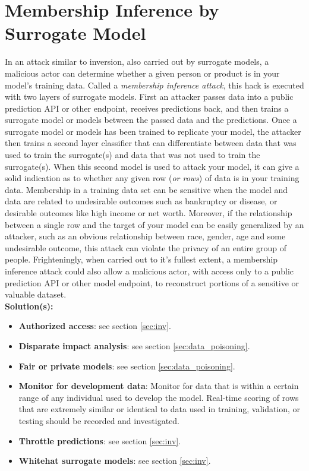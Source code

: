 \documentclass[fleqn]{article}
\begin{document}
\section{Membership Inference by Surrogate Model} \label{sec:mi}

In an attack similar to inversion, also carried out by surrogate models, a malicious actor can determine whether a given person or product is in your model's training data.  Called a \textit{membership inference attack}, this hack is executed with two layers of surrogate models. First an attacker passes data into a public prediction API or other endpoint, receives predictions back, and then trains a surrogate model or models between the passed data and the predictions. Once a surrogate model or models has been trained to replicate your model, the attacker then trains a second layer classifier that can differentiate between data that was used to train the surrogate(s) and data that was not used to train the surrogate(s). When this second model is used to attack your model, it can give a solid indication as to whether any given row (\textit{or rows}) of data is in your training data. Membership in a training data set can be sensitive when the model and data are related to undesirable outcomes such as bankruptcy or disease, or desirable outcomes like high income or net worth. Moreover, if the relationship between a single row and the target of your model can be easily generalized by an attacker, such as an obvious relationship between race, gender, age and some undesirable outcome, this attack can violate the privacy of an entire group of people. Frighteningly, when carried out to it's fullest extent, a membership inference attack could also allow a malicious actor, with access only to a public prediction API or other model endpoint, to reconstruct portions of a sensitive or valuable dataset.\\

\noindent\textbf{Solution(s):}
\begin{itemize}
\item \textbf{Authorized access}: see section \ref{sec:inv}.
\item \textbf{Disparate impact analysis}: see section \ref{sec:data_poisoning}.
\item \textbf{Fair or private models}: see section \ref{sec:data_poisoning}.
\item \textbf{Monitor for development data}: Monitor for data that is within a certain range of any individual used to develop the model. Real-time scoring of rows that are extremely similar or identical to data used in training, validation, or testing should be recorded and investigated. 
\item \textbf{Throttle predictions}: see section \ref{sec:inv}.
\item \textbf{Whitehat surrogate models}: see section \ref{sec:inv}.
\end{itemize}
\end{document}

